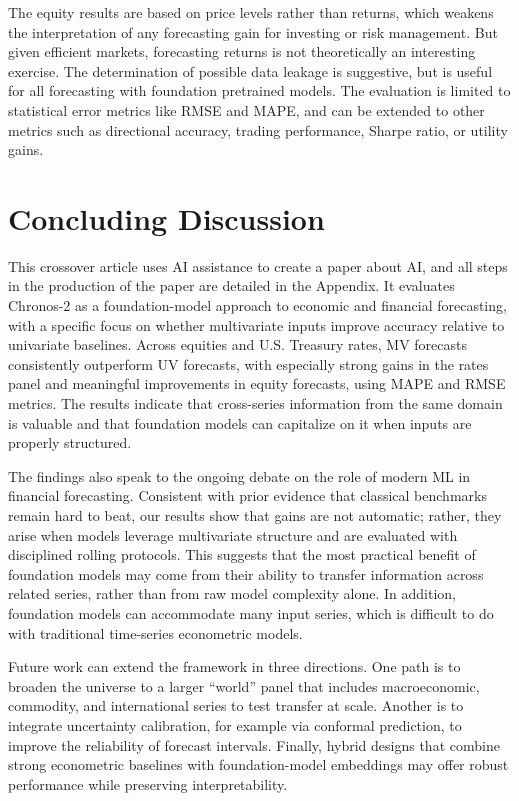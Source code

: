 \documentclass[twocolumn]{article}
\begin{document}
The equity results are based on price levels rather than returns, which weakens the interpretation of any forecasting gain for investing or risk management. But given efficient markets, forecasting returns is not theoretically an interesting exercise. The determination of possible data leakage is suggestive, but is useful for all forecasting with foundation pretrained models. The evaluation is limited to statistical error metrics like RMSE and MAPE, and can be extended to other metrics such as directional accuracy, trading performance, Sharpe ratio, or utility gains.


\section{Concluding Discussion}

This crossover article uses AI assistance to create a paper about AI, and all steps in the production of the paper are detailed in the Appendix. It evaluates Chronos-2 as a foundation-model approach to economic and financial forecasting, with a specific focus on whether multivariate inputs improve accuracy relative to univariate baselines. Across equities and U.S. Treasury rates, MV forecasts consistently outperform UV forecasts, with especially strong gains in the rates panel and meaningful improvements in equity forecasts, using MAPE and RMSE metrics. The results indicate that cross-series information from the same domain is valuable and that foundation models can capitalize on it when inputs are properly structured.

The findings also speak to the ongoing debate on the role of modern ML in financial forecasting. Consistent with prior evidence that classical benchmarks remain hard to beat, our results show that gains are not automatic; rather, they arise when models leverage multivariate structure and are evaluated with disciplined rolling protocols. This suggests that the most practical benefit of foundation models may come from their ability to transfer information across related series, rather than from raw model complexity alone. In addition,  foundation models can accommodate many input series, which is difficult to do with traditional time-series econometric models. 

Future work can extend the framework in three directions. One path is to broaden the universe to a larger ``world'' panel that includes macroeconomic, commodity, and international series to test transfer at scale. Another is to integrate uncertainty calibration, for example via conformal prediction, to improve the reliability of forecast intervals. Finally, hybrid designs that combine strong econometric baselines with foundation-model embeddings may offer robust performance while preserving interpretability.
\end{document}
